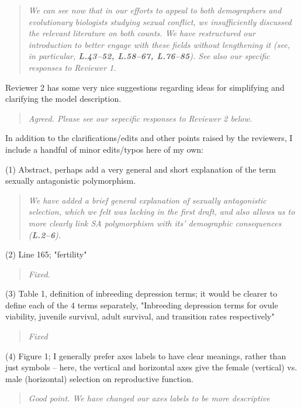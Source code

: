 \documentclass[11pt]{article}
\begin{document}
\begin{quote}
	{\itshape We can see now that in our efforts to appeal to both demographers and evolutionary biologists studying sexual conflict, we insufficiently discussed the relevant literature on both counts. We have restructured our introduction to better engage with these fields without lengthening it (see, in particular, {\bf L.43--52, L.58--67, L.76--85}). See also our specific responses to Reviewer 1. }
\end{quote}


Reviewer 2 has some very nice suggestions regarding ideas for simplifying and clarifying the model description.

\begin{quote}
	{\itshape Agreed. Please see our sepecific responses to Reviewer 2 below.}
\end{quote}

In addition to the clarifications/edits and other points raised by the reviewers, I include a handful of minor edits/typos here of my own:
\bigskip

\noindent (1) Abstract, perhaps add a very general and short explanation of the term sexually antagonistic polymorphism.
\begin{quote}
	{\itshape We have added a brief general explanation of sexually antagonistic selection, which we felt was lacking in the first draft, and also allows us to more clearly link SA polymorphism with its' demographic consequences ({\bf L.2--6}).}
\end{quote}

\noindent (2) Line 165; "fertility"
\begin{quote}
	{\itshape Fixed.}
\end{quote}

\noindent (3) Table 1, definition of inbreeding depression terms; it would be clearer to define each of the 4 terms separately, "Inbreeding depression terms for ovule viability, juvenile survival, adult survival, and transition rates respectively"
\begin{quote}
	{\itshape Fixed}
\end{quote}

\noindent (4) Figure 1; I generally prefer axes labels to have clear meanings, rather than just symbols – here, the vertical and horizontal axes give the female (vertical) vs. male (horizontal) selection on reproductive function.
\begin{quote}
	{\itshape Good point. We have changed our axes labels to be more descriptive }
\end{quote}
\end{document}
